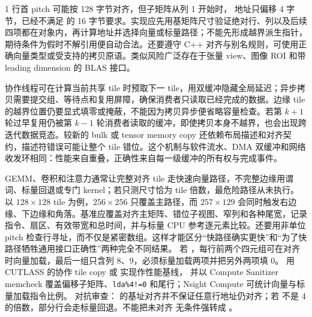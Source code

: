 \begin{solutionexercise}{1}
行首 pitch 可能按 128 字节对齐，但子矩阵从列 1 开始时， 地址只偏移 4 字节，已经不满足  的 16 字节要求。实现应先用基矩阵尺寸验证绝对行、列以及后续四项都在对象内，再计算地址并选择向量或标量路径；不能先形成越界派生指针，期待条件为假时不解引用便自动合法。还要遵守 C++ 对齐与别名规则，可使用正确向量类型或受支持的拷贝原语。类似风险广泛存在于张量 view、图像 ROI 和带 leading dimension 的 BLAS 接口。

协作线程可在计算当前共享 tile 时预取下一 tile，用双缓冲隐藏全局延迟；异步拷贝需要提交组、等待点和复用屏障，确保消费者只读取已经完成的数据。边缘 tile 的越界位置仍要显式填零或掩蔽，不能因为拷贝异步便省略容量检查。若第 $k+1$ 轮过早复用仍被第 $k-1$ 轮消费者读取的缓冲，即使拷贝本身不越界，也会出现跨迭代数据竞态。较新的 bulk 或 tensor memory copy 还依赖布局描述和对齐契约，描述符错误可能让整个 tile 错位。这个机制与软件流水、DMA 双缓冲和网络收发环相同：性能来自重叠，正确性来自每一级缓冲的所有权与完成事件。

GEMM、卷积和注意力通常让完整对齐 tile 走快速向量路径，不完整边缘用谓词、标量回退或专门 kernel；若只测尺寸恰为 tile 倍数，最危险路径从未执行。以 $128\times128$ tile 为例，$256\times256$ 只覆盖主路径，而 $257\times129$ 会同时触发右边缘、下边缘和角落。基准应覆盖对齐主矩阵、错位子视图、窄列和各种尾宽，记录指令、扇区、有效带宽和总时间，并与标量 CPU 参考逐元素比较。还要用非单位 pitch 检查行寻址，而不仅是紧密数组。这样才能区分“快路径确实更快”和“为了快路径牺牲通用接口正确性”两种完全不同结果。
\variantheading 若 ，每行前两个四元组可在对齐时向量加载，最后一组只含列
8、9，必须标量加载两项并把另外两项填 0。
\practiceheading 用 CUTLASS 的协作 tile copy 或  实现作性能基线，
并以 Compute Sanitizer memcheck 覆盖偏移子矩阵、\texttt{lda\%4!=0} 和尾行；Nsight Compute
可统计向量与标量加载指令比例。
对抗审查： 的基址对齐并不保证任意行地址仍对齐；若  不是
4 的倍数，部分行会走标量回退。不能把未对齐  无条件强转成 。
\end{solutionexercise}

